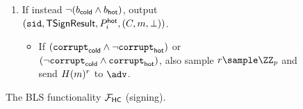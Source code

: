 \begin{savenotes}
\begin{figure*}
{{\begin{itemize}
\begin{enumerate}
            \begin{itemize}
                \item If $(\texttt{corrupt}_\cold \land \neg \texttt{corrupt}_\hot)$, also send $\sigma_i^\hot$ to $\adv$. If $(\neg \texttt{corrupt}_\cold \land \texttt{corrupt}_\hot)$, send $\sigma_i^\cold$ to $\adv$.
                \item Additionally, for every party $P_j^\hot$ such that $(P_j^\hot, *) \in \mathcal{I}$, retrieve $(P_j^\hot, *, \texttt{allowc}) \in \hotstates$ and set $\texttt{allowc}$ to 0.
            \end{itemize}
            \item If instead $\neg (b_{\mathsf{cold}} \land b_{\mathsf{hot}})$, output $(\texttt{sid}, \mathsf{TSignResult}, P_i^{\mathsf{hot}}, (C, m, \perp))$.
            \begin{itemize}
                \item If $(\texttt{corrupt}_\cold \land \neg \texttt{corrupt}_\hot)$ or $(\neg \texttt{corrupt}_\cold \land \texttt{corrupt}_\hot)$, also sample $r \sample \ZZ_p$ and send $H(m)^r$ to $\adv$.
            \end{itemize}
        \end{enumerate}
    \end{itemize} 
    }}
        \caption{The BLS \hcwl functionality $\mathcal{F}_\mathsf{HC}$ (signing).}
        \label{fig:FSign3}
    \end{figure*}
    \end{savenotes}

